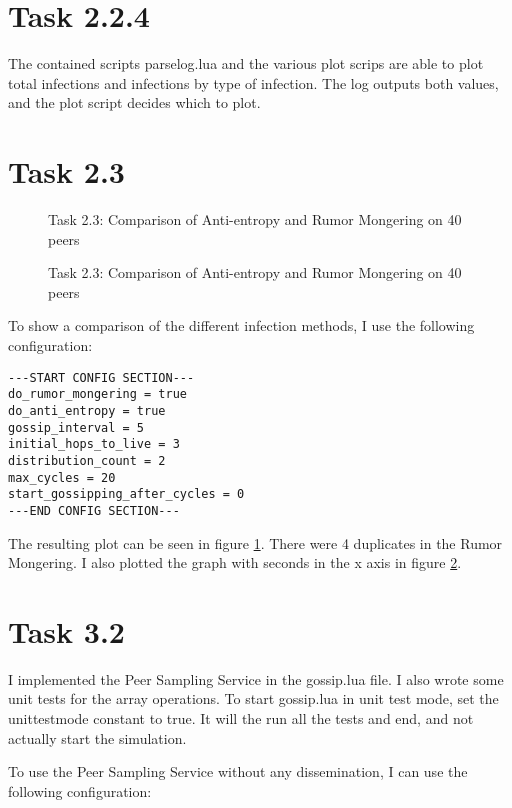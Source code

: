 \documentclass[a4paper]{article}
\begin{document}
\section{Task 2.2.4}

The contained scripts parselog.lua and the various plot scrips are able to plot total infections and infections by type of infection. The log outputs both values, and the plot script decides which to plot.

\section{Task 2.3}

\begin{figure}
    
    \caption{Task 2.3: Comparison of Anti-entropy and Rumor Mongering on 40 peers}
    \label{fig:2-3}
\end{figure}

\begin{figure}
    
    \caption{Task 2.3: Comparison of Anti-entropy and Rumor Mongering on 40 peers}
    \label{fig:2-3_seconds}
\end{figure}

To show a comparison of the different infection methods, I use the following configuration:

\begin{lstlisting}
---START CONFIG SECTION---
do_rumor_mongering = true
do_anti_entropy = true
gossip_interval = 5
initial_hops_to_live = 3
distribution_count = 2
max_cycles = 20
start_gossipping_after_cycles = 0
---END CONFIG SECTION---
\end{lstlisting}

The resulting plot can be seen in figure \ref{fig:2-3}. There were 4 duplicates in the Rumor Mongering. I also plotted the graph with seconds in the x axis in figure \ref{fig:2-3_seconds}.

\section{Task 3.2}

I implemented the Peer Sampling Service in the gossip.lua file. I also wrote some unit tests for the array operations. To start gossip.lua in unit test mode, set the unit\textunderscore test\textunderscore mode constant to true. It will the run all the tests and end, and not actually start the simulation.

To use the Peer Sampling Service without any dissemination, I can use the following configuration:
\end{document}
